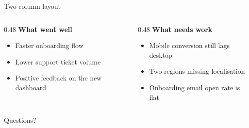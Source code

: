 \documentclass[10pt]{beamer}
\begin{document}
\begin{frame}{Two-column layout}
  \begin{columns}[T]
    \begin{column}{0.48\textwidth}
      \textbf{What went well}
      \begin{itemize}
        \item Faster onboarding flow
        \item Lower support ticket volume
        \item Positive feedback on the new dashboard
      \end{itemize}
    \end{column}
    \begin{column}{0.48\textwidth}
      \textbf{What needs work}
      \begin{itemize}
        \item Mobile conversion still lags desktop
        \item Two regions missing localisation
        \item Onboarding email open rate is flat
      \end{itemize}
    \end{column}
  \end{columns}
\end{frame}

\begin{frame}[standout]
  Questions?
\end{frame}
\end{document}
